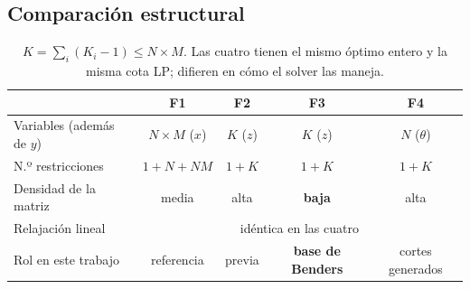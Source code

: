 \subsection{Comparación estructural}
\begin{table}[h]\centering
\begin{tabular}{lcccc}
\toprule
 & \textbf{F1} & \textbf{F2} & \textbf{F3} & \textbf{F4} \\
\midrule
Variables (además de $y$) & $N\!\times\!M$ ($x$) & $K$ ($z$) & $K$ ($z$) & $N$ ($\theta$) \\
N.º restricciones & $1+N+NM$ & $1+K$ & $1+K$ & $1+K$ \\
Densidad de la matriz & media & alta & \textbf{baja} & alta \\
Relajación lineal & \multicolumn{4}{c}{idéntica en las cuatro} \\
Rol en este trabajo & referencia & previa & \textbf{base de Benders} & cortes generados \\
\bottomrule
\end{tabular}
\caption{$K=\sum_i (K_i-1)\le N\times M$. Las cuatro tienen el mismo óptimo entero y la misma cota LP;
difieren en cómo el solver las maneja.}
\end{table}
